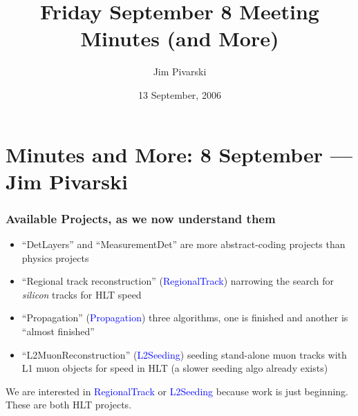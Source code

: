 \documentclass[12pt,compress]{beamer}
\title{Friday September 8 Meeting \\ Minutes (and More)}
\author{Jim Pivarski}
\institute{Texas A\&M University}
\date{13 September, 2006}
\begin{document}
\frame{\titlepage}
\section*{Minutes and More: 8 September --- Jim Pivarski}

\begin{frame}
\frametitle{Available Projects, as we now understand them}
\begin{itemize}
\item ``DetLayers'' and ``MeasurementDet'' are more abstract-coding
projects than physics projects

\item ``Regional track reconstruction'' (\textcolor{blue}{RegionalTrack}) narrowing the
search for {\it silicon} tracks for HLT speed

\item ``Propagation'' (\textcolor{blue}{Propagation}) three algorithms, one is finished
and another is ``almost finished''

\item ``L2MuonReconstruction'' (\textcolor{blue}{L2Seeding}) seeding stand-alone muon
tracks with L1 muon objects for speed in HLT (a slower seeding algo
already exists)
\end{itemize}

\vfill We are interested in \textcolor{blue}{RegionalTrack} or
\textcolor{blue}{L2Seeding} because work is just beginning.  These are
both HLT projects.
\end{frame}
\end{document}
